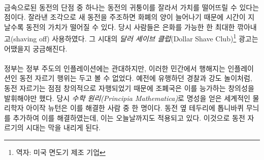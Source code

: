 \paragraph{}
\begin{comment}
	One of the downsides of using precious metal coins is that they can be
	clipped, effectively debasing the value of the coin. New coins can be
	minted from the clippings, inflating the money supply over time,
	devaluing every individual coin in the process. People were literally
	shaving off as much as they could get away with of their silver dollars.
	I wonder what kind of \textit{Dollar Shave Club} advertisements they had back
	in the day.
\end{comment}
금속으로된 동전의 단점 중 하나는 동전의 귀퉁이를 잘라서 가치를 떨어뜨릴 수 있다는 점이다. 
잘라낸 조각으로 새 동전을 주조하면 화폐의 양이 늘어나기 때문에 시간이 지날수록 동전의 가치가 떨어질 수 있다.
당시 사람들은 은화를 가능한 한 최대한 깎아내고(shaving off) 사용하였다.
그 시대의 \textit{달러 셰이브 클럽}(Dollar Shave Club)\footnote{역자: 미국 면도기 제조 기업} 광고는 어땠을지 궁금해진다.

\paragraph{}
\begin{comment}
	Since governments are only cool with inflation if they are the ones
	doing it, efforts were made to stop this guerrilla debasement. In
	classic cops-and-robbers fashion, coin clippers got ever more creative
	with their techniques, forcing the \enquote{masters of the mint} to get even
	more creative with their countermeasures. Isaac Newton, the
	world-renowned physicist of \textit{Principia Mathematica} fame, used to be one
	of these masters. He is attributed with adding the small stripes at the
	side of coins which are still present today. Gone were the days of easy
	coin shaving.
\end{comment}
정부는 정부 주도의 인플레이션에는 관대하지만, 
이러한 민간에서 행해지는 인플레이션인 동전 자르기 행위는 두고 볼 수 없었다. 
예전에 유행하던 경찰과 강도 놀이처럼, 
동전 자르기는 점점 창의적으로 자행되었기 때문에 조폐국은 이를 능가하는 창의성을 발휘해야만 했다.
당시 \textit{수학 원리(Principia Mathematica)}로 명성을 얻은 세계적인 물리학자 아이작 뉴턴은 이를 해결한 사람 중 한 명이다. 
동전 옆 테두리에 톱니바퀴 무늬를 추가하여 이를 해결하였는데, 이는 오늘날까지도 적용되고 있다.
이것으로 동전 자르기의 시대는 막을 내리게 된다.

